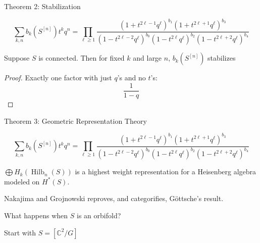 \documentclass{beamer}
\DeclareMathOperator{\Hilb}{Hilb}
\newcommand{\C}{\mathbb{C}}
\begin{document}
\begin{frame}{Theorem 2: Stabilization}
  \begin{Theorem}[G\"ottsche, 1990]
$$\sum_{k,n} b_k(S^{[n]})t^k q^n=\prod_{\ell\geq 1} \frac{(1+t^{2\ell-1}q^\ell)^{b_1}(1+t^{2\ell+1}q^\ell)^{b_3}}{(1-t^{2\ell-2}q^\ell)^{b_0}(1-t^{2\ell}q^\ell)^{b_2}(1-t^{2\ell+2}q^\ell)^{b_4}}$$
\end{Theorem}
\begin{corollary}  Suppose $S$ is connected.
Then for fixed $k$ and large $n$, $b_{k}(S^{[n]})$ stabilizes
\end{corollary}

\begin{proof}
Exactly one factor with just $q$'s and no $t$'s:
$$\frac{1}{1-q}$$ 

\end{proof}


\end{frame}


\begin{frame}{Theorem 3: Geometric Representation Theory}
  \begin{Theorem}[G\"ottsche, 1990]
$$\sum_{k,n} b_k(S^{[n]})t^k q^n=\prod_{\ell\geq 1} \frac{(1+t^{2\ell-1}q^\ell)^{b_1}(1+t^{2\ell+1}q^\ell)^{b_3}}{(1-t^{2\ell-2}q^\ell)^{b_0}(1-t^{2\ell}q^\ell)^{b_2}(1-t^{2\ell+2}q^\ell)^{b_4}}$$
\end{Theorem}
\begin{Theorem}
$\bigoplus H_k(\Hilb_n(S))$ is a highest weight representation for a Heisenberg algebra modeled on $H^*(S)$.
\end{Theorem}
Nakajima and Grojnowski reproves, and categorifies, G\"ottsche's
result.  
\end{frame}

\begin{frame}[plain,c]

\begin{center}

\Huge


 
 What happens when $S$ is an orbifold?
\end{center}

\begin{center}
\Huge
Start with $S=[\C^2/G]$
\end{center}

\end{frame}
\end{document}
